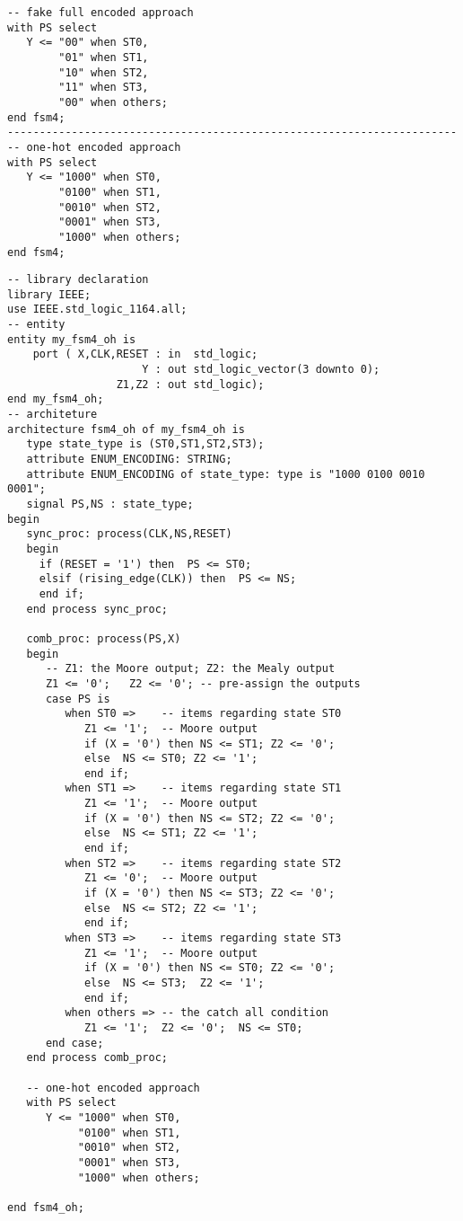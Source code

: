\noindent
\begin{minipage}{0.99\linewidth}
\begin{lstlisting}[label=exe_21_code_3, caption=Modifications to convert state output to pseudo one-hot encoding.]
-- fake full encoded approach 
with PS select
   Y <= "00" when ST0, 
        "01" when ST1, 
        "10" when ST2, 
        "11" when ST3, 
        "00" when others; 
end fsm4;
----------------------------------------------------------------------
-- one-hot encoded approach 
with PS select
   Y <= "1000" when ST0, 
        "0100" when ST1, 
        "0010" when ST2, 
        "0001" when ST3, 
        "1000" when others; 
end fsm4;
\end{lstlisting}
\end{minipage}

\noindent
\begin{minipage}{0.99\linewidth}
\begin{lstlisting}[label=exe_21_code_4, caption=The final solution to Example 21.]
-- library declaration
library IEEE;
use IEEE.std_logic_1164.all;
-- entity
entity my_fsm4_oh is 
    port ( X,CLK,RESET : in  std_logic; 
                     Y : out std_logic_vector(3 downto 0); 
                 Z1,Z2 : out std_logic);  
end my_fsm4_oh;
-- architeture
architecture fsm4_oh of my_fsm4_oh is
   type state_type is (ST0,ST1,ST2,ST3);
   attribute ENUM_ENCODING: STRING; 
   attribute ENUM_ENCODING of state_type: type is "1000 0100 0010 0001";
   signal PS,NS : state_type; 
begin
   sync_proc: process(CLK,NS,RESET)
   begin
     if (RESET = '1') then  PS <= ST0; 
     elsif (rising_edge(CLK)) then  PS <= NS; 
     end if; 
   end process sync_proc; 

   comb_proc: process(PS,X)
   begin
      -- Z1: the Moore output; Z2: the Mealy output
      Z1 <= '0';   Z2 <= '0'; -- pre-assign the outputs
      case PS is 
         when ST0 =>    -- items regarding state ST0
            Z1 <= '1';  -- Moore output 
            if (X = '0') then NS <= ST1; Z2 <= '0';   
            else  NS <= ST0; Z2 <= '1';
            end if; 
         when ST1 =>    -- items regarding state ST1
            Z1 <= '1';  -- Moore output 
            if (X = '0') then NS <= ST2; Z2 <= '0';  
            else  NS <= ST1; Z2 <= '1'; 
            end if; 
         when ST2 =>    -- items regarding state ST2
            Z1 <= '0';  -- Moore output 
            if (X = '0') then NS <= ST3; Z2 <= '0'; 
            else  NS <= ST2; Z2 <= '1'; 
            end if; 
         when ST3 =>    -- items regarding state ST3
            Z1 <= '1';  -- Moore output 
            if (X = '0') then NS <= ST0; Z2 <= '0'; 
            else  NS <= ST3;  Z2 <= '1';     
            end if; 
         when others => -- the catch all condition
            Z1 <= '1';  Z2 <= '0';  NS <= ST0; 
      end case; 
   end process comb_proc; 
 
   -- one-hot encoded approach 
   with PS select
      Y <= "1000" when ST0, 
           "0100" when ST1, 
           "0010" when ST2, 
           "0001" when ST3, 
           "1000" when others; 

end fsm4_oh;
\end{lstlisting}
\end{minipage}

